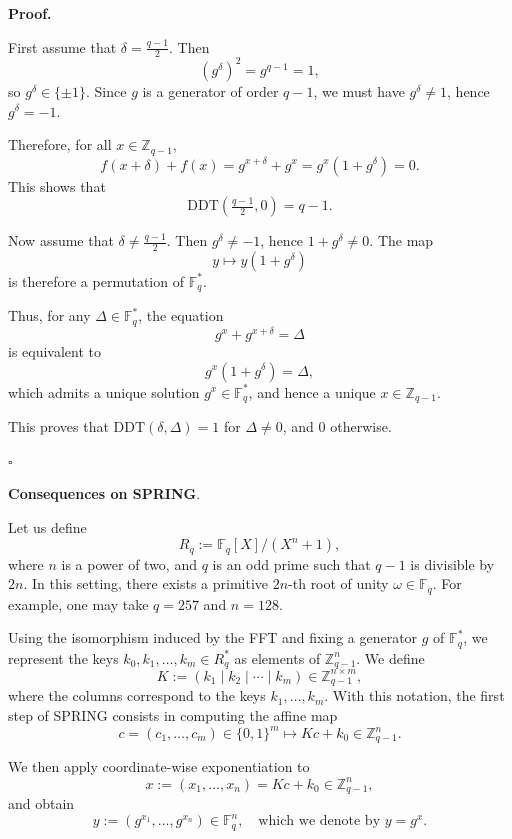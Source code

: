 \documentclass{article}
\begin{document}
\medskip

\textbf{Proof.}

First assume that $\delta = \frac{q-1}{2}$. Then
\[
(g^\delta)^2 = g^{q-1} = 1,
\]
so $g^\delta \in \{\pm 1\}$. Since $g$ is a generator of order $q-1$, we must have $g^\delta \neq 1$, hence $g^\delta = -1$.

Therefore, for all $x \in \mathbb{Z}_{q-1}$,
\[
f(x+\delta) + f(x) = g^{x+\delta} + g^x = g^x(1 + g^\delta) = 0.
\]
This shows that
\[
\mathrm{DDT}\!\left(\tfrac{q-1}{2}, 0\right) = q-1.
\]

\medskip

Now assume that $\delta \neq \frac{q-1}{2}$. Then $g^\delta \neq -1$, hence $1 + g^\delta \neq 0$. The map
\[
y \mapsto y(1 + g^\delta)
\]
is therefore a permutation of $\mathbb{F}_q^*$.

Thus, for any $\Delta \in \mathbb{F}_q^*$, the equation
\[
g^x + g^{x+\delta} = \Delta
\]
is equivalent to
\[
g^x (1 + g^\delta) = \Delta,
\]
which admits a unique solution $g^x \in \mathbb{F}_q^*$, and hence a unique $x \in \mathbb{Z}_{q-1}$.

This proves that $\mathrm{DDT}(\delta, \Delta) = 1$ for $\Delta \neq 0$, and $0$ otherwise.

\hfill $\square$

\textbf{Consequences on SPRING}.

Let us define
\[
R_q := \mathbb{F}_q[X]/(X^n + 1),
\]
where \(n\) is a power of two, and \(q\) is an odd prime such that \(q-1\) is divisible by \(2n\). In this setting, there exists a primitive \(2n\)-th root of unity \(\omega \in \mathbb{F}_q\). For example, one may take \(q=257\) and \(n=128\).

Using the isomorphism induced by the FFT and fixing a generator \(g\) of \(\mathbb{F}_q^\ast\), we represent the keys
\(k_0, k_1, \dots, k_m \in R_q^\ast\)
as elements of \(\mathbb{Z}_{q-1}^n\). We define
\[
K := (k_1 \mid k_2 \mid \cdots \mid k_m) \in \mathbb{Z}_{q-1}^{n \times m},
\]
where the columns correspond to the keys \(k_1,\dots,k_m\). With this notation, the first step of SPRING consists in computing the affine map
\[
c = (c_1,\dots,c_m) \in \{0,1\}^m \longmapsto Kc + k_0 \in \mathbb{Z}_{q-1}^n.
\]

We then apply coordinate-wise exponentiation to
\[
x := (x_1,\dots,x_n) = Kc + k_0 \in \mathbb{Z}_{q-1}^n,
\]
and obtain
\[
y := (g^{x_1},\dots,g^{x_n}) \in \mathbb{F}_q^n,
\quad \text{which we denote by } y = g^x.
\]

\vspace{0.3cm}
\end{document}
